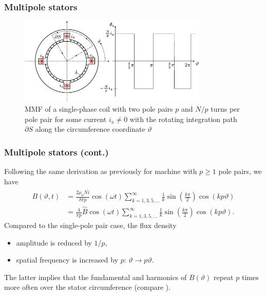 \begin{frame}
	\frametitle{Multipole stators}
        \begin{figure}
                \centering
                \includegraphics[width=0.8\textwidth]{fig/lec05/MMF_single_phase_two_pole_pairs.pdf}
                \caption{MMF of a single-phase coil with two pole pairs $p$ and $N/p$ turns per pole pair for some current $i_\mathrm{a} \neq 0$ with the rotating integration path $\partial S$  along the circumference coordinate $\vartheta$}
                \label{fig: MMF_single_phase_two_pole_pairs}
        \end{figure}
\end{frame}

\begin{frame}
	\frametitle{Multipole stators (cont.)}
        Following the same derivation as previously for machine with $p\geq 1$ pole pairs, we have    \begin{equation}
            \begin{split}
                B(\vartheta, t) &= \frac{2 \mu_0 N \hat{i}}{\delta \pi p}\cos(\omega t)\sum_{k=1,3,5,\ldots}^{\infty}   \frac{1}{k}\sin(\frac{k \pi}{2}) \cos(k p \vartheta)\\ &= \frac{4}{\pi p} \hat{B} \cos(\omega t)\sum_{k=1,3,5,\ldots}^{\infty}   \frac{1}{k}\sin(\frac{k \pi}{2}) \cos(k p \vartheta).
            \end{split}
            \label{eq:B_single_phase_coil_fourier_series_multi_pole}
        \end{equation}
        Compared to the single-pole pair case, the flux density 
        \begin{itemize}
            \item amplitude is reduced by $1/p$,
            \item spatial frequency is increased by $p$: $\vartheta \rightarrow p \vartheta$. 
        \end{itemize}
        The latter implies that the fundamental and harmonics of $B(\vartheta)$ repeat $p$ times more often over the stator circumference (compare ).
\end{frame}

